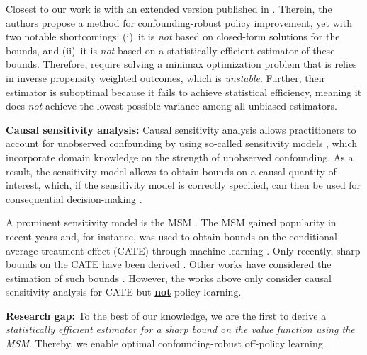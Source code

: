 Closest to our work is \citet{Kallus.2018c} with an extended version published in \citet{Kallus.2021d}. Therein, the authors propose a method for confounding-robust policy improvement, yet with two notable shortcomings: (i)~it is \emph{not} based on closed-form solutions for the bounds, and (ii)~it is \emph{not} based on a statistically efficient estimator of these bounds. Therefore, \citet{Kallus.2018c,Kallus.2021d} require solving a minimax optimization problem that is relies in inverse propensity weighted outcomes, which is \emph{unstable}. Further, their estimator is suboptimal because it fails to achieve statistical efficiency, meaning it does \emph{not} achieve the lowest-possible variance among all unbiased estimators. 



\textbf{Causal sensitivity analysis:} Causal sensitivity analysis \citet{Cornfield.1959} allows practitioners to account for unobserved confounding by using so-called sensitivity models \cite{Rosenbaum.1987, Jin.2022}, which incorporate domain knowledge on the strength of unobserved confounding. As a result, the sensitivity model allows to obtain bounds on a causal quantity of interest, which, if the sensitivity model is correctly specified, can then be used for consequential decision-making  \cite{Jesson.2021}. 

A prominent sensitivity model is the MSM \cite{Tan.2006}. The MSM gained popularity in recent years and, for instance, was used to obtain bounds on the conditional average treatment effect (CATE) through machine learning \cite{Kallus.2019, Jesson.2021, Yin.2022}. Only recently, sharp bounds on the CATE have been derived \cite{Bonvini.2022, Dorn.2022, Frauen.2023c, Frauen.2024b, Jin.2023}. Other works have considered the estimation of such bounds \cite{Dorn.2024, Oprescu.2023}. However, the works above only consider causal sensitivity analysis for CATE but \textbf{\underline{not}} policy learning.

\textbf{Research gap:} To the best of our knowledge, we are the first to derive a \emph{statistically efficient estimator for a sharp bound on the value function using the MSM}. Thereby, we enable optimal confounding-robust off-policy learning.